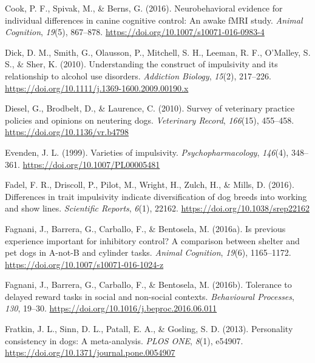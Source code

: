 \documentclass[
  ,pub,floatsintext]{apa6}
\newlength{\cslhangindent}
\newlength{\cslentryspacingunit} %
\newenvironment{CSLReferences}[2] %
 {%
  \setlength{\parindent}{0pt}
  \ifodd #1
  \let\oldpar\par
  \def\par{\hangindent=\cslhangindent\oldpar}
  \fi
  \setlength{\parskip}{#2\cslentryspacingunit}
 }%
 {}
\begin{document}
\begin{CSLReferences}{1}{0}
\leavevmode{}%
Cook, P. F., Spivak, M., \& Berns, G. (2016). Neurobehavioral evidence for individual differences in canine cognitive control: An awake {fMRI} study. \emph{Animal Cognition}, \emph{19}(5), 867--878. \url{https://doi.org/10.1007/s10071-016-0983-4}

\leavevmode{}%
Dick, D. M., Smith, G., Olausson, P., Mitchell, S. H., Leeman, R. F., O'Malley, S. S., \& Sher, K. (2010). Understanding the construct of impulsivity and its relationship to alcohol use disorders. \emph{Addiction Biology}, \emph{15}(2), 217--226. \url{https://doi.org/10.1111/j.1369-1600.2009.00190.x}

\leavevmode{}%
Diesel, G., Brodbelt, D., \& Laurence, C. (2010). Survey of veterinary practice policies and opinions on neutering dogs. \emph{Veterinary Record}, \emph{166}(15), 455--458. \url{https://doi.org/10.1136/vr.b4798}

\leavevmode{}%
Evenden, J. L. (1999). Varieties of impulsivity. \emph{Psychopharmacology}, \emph{146}(4), 348--361. \url{https://doi.org/10.1007/PL00005481}

\leavevmode{}%
Fadel, F. R., Driscoll, P., Pilot, M., Wright, H., Zulch, H., \& Mills, D. (2016). Differences in trait impulsivity indicate diversification of dog breeds into working and show lines. \emph{Scientific Reports}, \emph{6}(1), 22162. \url{https://doi.org/10.1038/srep22162}

\leavevmode{}%
Fagnani, J., Barrera, G., Carballo, F., \& Bentosela, M. (2016a). Is previous experience important for inhibitory control? {A} comparison between shelter and pet dogs in {A-not-B} and cylinder tasks. \emph{Animal Cognition}, \emph{19}(6), 1165--1172. \url{https://doi.org/10.1007/s10071-016-1024-z}

\leavevmode{}%
Fagnani, J., Barrera, G., Carballo, F., \& Bentosela, M. (2016b). Tolerance to delayed reward tasks in social and non-social contexts. \emph{Behavioural Processes}, \emph{130}, 19--30. \url{https://doi.org/10.1016/j.beproc.2016.06.011}

\leavevmode{}%
Fratkin, J. L., Sinn, D. L., Patall, E. A., \& Gosling, S. D. (2013). Personality consistency in dogs: {A} meta-analysis. \emph{PLOS ONE}, \emph{8}(1), e54907. \url{https://doi.org/10.1371/journal.pone.0054907}


\end{CSLReferences}
\end{document}
